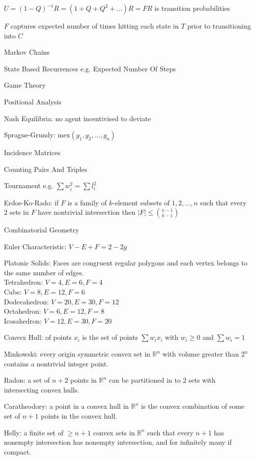 $U=(1-Q)^{-1}R=(1+Q+Q^2+\dots)R=FR$ is transition probabilities

$F$ captures expected number of times hitting each state in $T$ prior to transitioning into $C$

Markov Chains

State Based Recurrences e.g. Expected Number Of Steps

Game Theory

Positional Analysis

Nash Equilibria: no agent incentivised to deviate

Sprague-Grundy: $\text{mex}({g_1,g_2,\dots,g_n})$

Incidence Matrices

Counting Pairs And Triples

Tournament e.g. $\sum w_i^2 = \sum l_i^2$

Erdos-Ko-Rado: if $F$ is a family of $k$-element subsets of ${1,2, \dots,n}$ such that every $2$ sets in $F$ have nontrivial intersection then $|F| \le \binom{n-1}{k-1}$

Combinatorial Geometry

Euler Characteristic: $V-E+F=2-2g$

Platonic Solids: Faces are congruent regular polygons and each vertex belongs to the same number of edges. \\
Tetrahedron: $V=4, E=6, F=4$ \\
Cube: $V=8, E=12, F=6$ \\
Dodecahedron: $V=20, E=30, F=12$ \\
Octahedron: $V=6, E=12, F=8$ \\
Icosahedron: $V=12, E=30, F=20$

Convex Hull: of points $x_i$ is the set of points $\sum w_i x_i$ with $w_i \ge 0$ and $\sum w_i = 1$

Minkowski: every origin symmetric convex set in $\mathbb{R}^n$ with volume greater than $2^n$ contains a nontrivial integer point.

Radon: a set of $n+2$ points in $\mathbb{R}^n$ can be partitioned in to $2$ sets with intersecting convex hulls.

Caratheodory: a point in a convex hull in $\mathbb{R}^n$ is the convex combination of some set of $n+1$ points in the convex hull.

Helly: a finite set of $\ge n+1$ convex sets in $\mathbb{R}^n$ such that every $n+1$ has nonempty intersection has nonempty intersection, and for infinitely many if compact.

